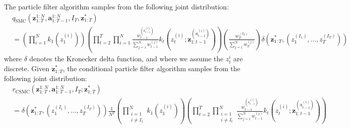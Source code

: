 \documentclass[11pt]{article}
\newcommand{\z}{\mathbf{z}}
\newcommand{\abold}{\mathbf{a}}
\begin{document}
The particle filter algorithm samples from the following joint distribution:
\begin{align*}
    & q_{\mathrm{SMC}}(\z_{1:T}^{1:N}, \abold_{1:T-1}^{1:N}, I_T, \z_{1:T}^*)\\
    &=  \left( \prod_{i=1}^N k_1(z_1^{(i)}) \right)
        \left( \prod_{t=2}^T \prod_{i=1}^N \frac{w_{t-1}^{(a_{t-1}^{(i)})}}{\sum_{j=1}^N w_{t-1}^{(j)}} k_t(z_t^{(i)}; \z_{1:t-1}^{(a_{t-1}^{(i)})} )\right)
        \left( \frac{w_T^{(I_T)}}{\sum_{j=1}^N w_T^{(j)}} \right)
        \delta(\z_{1:T}^*,  (z_1^{(I_1)}, \ldots, z_T^{(I_T)}))
\end{align*}
where $\delta$ denotes the Kronecker delta function, and where we assume the $z_{t}^i$ are discrete.
Given $\z_{1:T}^*$, the conditional particle filter algorithm samples from the following joint distribution:
\begin{align*}
    & r_{\mathrm{CSMC}}(\z_{1:T}^{1:N}, \abold_{1:T-1}^{1:N}, I_T; \z_{1:T}^*)\\
    &=  \delta(\z_{1:T}^*,  (z_1^{(I_1)}, \ldots, z_T^{(I_T)}))
        \frac{1}{N^T}
        \left( \prod_{\substack{i=1\\i \ne I_1}}^N k_1(z_1^{(i)}) \right)
        \left( \prod_{t=2}^T \prod_{\substack{i=1\\i \ne I_t}}^N \frac{w_{t-1}^{(a_{t-1}^{(i)})}}{\sum_{j=1}^N w_{t-1}^{(j)}} k_t(z_t^{(i)}; \z_{1:t-1}^{(a_{t-1}^{(i)})} )\right)
\end{align*}
\end{document}
